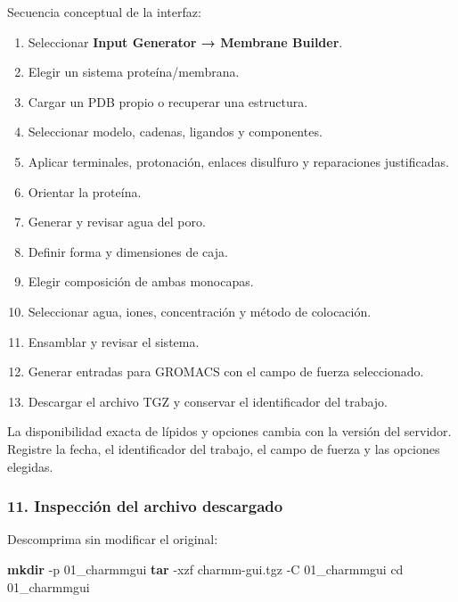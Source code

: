 \documentclass[
  spanish,
  11pt,
  a4paper]{article}
\newenvironment{Shaded}{\begin{snugshade}}{\end{snugshade}}
\newcommand{\AttributeTok}[1]{\textcolor[rgb]{0.13,0.29,0.53}{#1}}
\newcommand{\BuiltInTok}[1]{#1}
\newcommand{\FunctionTok}[1]{\textcolor[rgb]{0.13,0.29,0.53}{\textbf{#1}}}
\newcommand{\NormalTok}[1]{#1}
\providecommand{\tightlist}{%
  \setlength{\itemsep}{0pt}\setlength{\parskip}{0pt}}
\begin{document}
Secuencia conceptual de la interfaz:

\begin{enumerate}
\def\labelenumi{\arabic{enumi}.}
\tightlist
\item
  Seleccionar \textbf{Input Generator → Membrane Builder}.
\item
  Elegir un sistema proteína/membrana.
\item
  Cargar un PDB propio o recuperar una estructura.
\item
  Seleccionar modelo, cadenas, ligandos y componentes.
\item
  Aplicar terminales, protonación, enlaces disulfuro y reparaciones
  justificadas.
\item
  Orientar la proteína.
\item
  Generar y revisar agua del poro.
\item
  Definir forma y dimensiones de caja.
\item
  Elegir composición de ambas monocapas.
\item
  Seleccionar agua, iones, concentración y método de colocación.
\item
  Ensamblar y revisar el sistema.
\item
  Generar entradas para GROMACS con el campo de fuerza seleccionado.
\item
  Descargar el archivo TGZ y conservar el identificador del trabajo.
\end{enumerate}

La disponibilidad exacta de lípidos y opciones cambia con la versión del
servidor. Registre la fecha, el identificador del trabajo, el campo de
fuerza y las opciones elegidas.

\subsubsection{11. Inspección del archivo
descargado}\label{inspecciuxf3n-del-archivo-descargado}

Descomprima sin modificar el original:

\begin{Shaded}
\begin{Highlighting}[]
\FunctionTok{mkdir} \AttributeTok{{-}p}\NormalTok{ 01\_charmmgui}
\FunctionTok{tar} \AttributeTok{{-}xzf}\NormalTok{ charmm{-}gui.tgz }\AttributeTok{{-}C}\NormalTok{ 01\_charmmgui}
\BuiltInTok{cd}\NormalTok{ 01\_charmmgui}
\end{Highlighting}
\end{Shaded}
\end{document}
